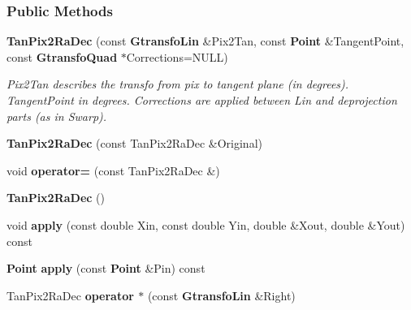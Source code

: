 \subsubsection*{Public Methods}
\begin{CompactItemize}
\item 
{}
{\bf Tan\-Pix2Ra\-Dec} (const {\bf Gtransfo\-Lin} \&Pix2Tan, const {\bf Point} \&Tangent\-Point, const {\bf Gtransfo\-Quad} $\ast$Corrections=NULL)\label{class_tanpix2radec_a0}

\begin{CompactList}\small\item\em Pix2Tan describes the transfo from pix to tangent plane (in degrees). Tangent\-Point in degrees. Corrections are applied between Lin and deprojection parts (as in Swarp).\item\end{CompactList}\item 
{}
{\bf Tan\-Pix2Ra\-Dec} (const Tan\-Pix2Ra\-Dec \&Original)\label{class_tanpix2radec_a1}

\item 
{}
void {\bf operator=} (const Tan\-Pix2Ra\-Dec \&)\label{class_tanpix2radec_a2}

\item 
{}
{\bf Tan\-Pix2Ra\-Dec} ()\label{class_tanpix2radec_a3}

\item 
{}
void {\bf apply} (const double Xin, const double Yin, double \&Xout, double \&Yout) const\label{class_tanpix2radec_a4}

\item 
{}
{\bf Point} {\bf apply} (const {\bf Point} \&Pin) const\label{class_tanpix2radec_a5}

\item 
{}
Tan\-Pix2Ra\-Dec {\bf operator $\ast$} (const {\bf Gtransfo\-Lin} \&Right)\label{class_tanpix2radec_a6}


\end{CompactItemize}
